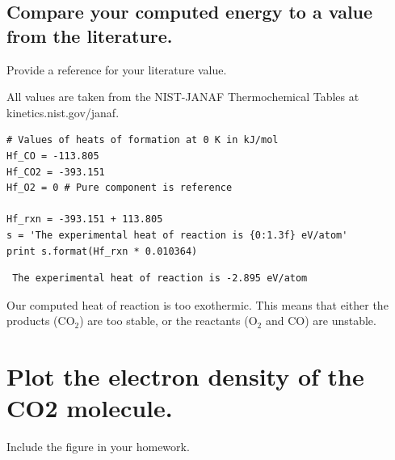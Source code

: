 \documentclass[11pt]{article}
\begin{document}
\subsection{Compare your computed energy to a value from the literature.}
\label{sec-2-3}

Provide a reference for your literature value.

All values are taken from the NIST-JANAF Thermochemical Tables at kinetics.nist.gov/janaf.


\begin{verbatim}
# Values of heats of formation at 0 K in kJ/mol
Hf_CO = -113.805
Hf_CO2 = -393.151
Hf_O2 = 0 # Pure component is reference

Hf_rxn = -393.151 + 113.805
s = 'The experimental heat of reaction is {0:1.3f} eV/atom'
print s.format(Hf_rxn * 0.010364)
\end{verbatim}

\begin{verbatim}
 The experimental heat of reaction is -2.895 eV/atom
\end{verbatim}

Our computed heat of reaction is too exothermic. This means that either the products
(CO$_{2}$) are too stable, or the reactants (O$_{2}$ and CO) are unstable.
\section{Plot the electron density of the CO2 molecule.}
\label{sec-3}

Include the figure in your homework.
\end{document}
